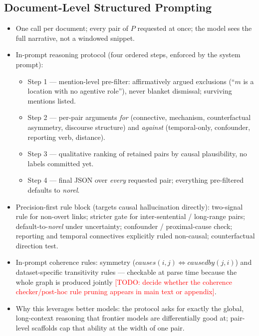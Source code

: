 \documentclass[11pt]{article}
\newcommand{\todo}[1]{\textcolor{red}{[TODO: #1]}}
\newcommand{\method}{SCOTECI}
\begin{document}

\subsection{Document-Level Structured Prompting}
\label{sec:docprompt}
\begin{itemize}
  \item One call per document; every pair of $P$ requested at once; the model
        sees the full narrative, not a windowed snippet.
  \item In-prompt reasoning protocol (four ordered steps, enforced by the
        system prompt):
        \begin{itemize}
          \item Step 1 --- mention-level pre-filter: affirmatively argued
                exclusions (``$m$ is a location with no agentive role''), never
                blanket dismissal; surviving mentions listed.
          \item Step 2 --- per-pair arguments \emph{for} (connective, mechanism,
                counterfactual asymmetry, discourse structure) and
                \emph{against} (temporal-only, confounder, reporting verb,
                distance).
          \item Step 3 --- qualitative ranking of retained pairs by causal
                plausibility, no labels committed yet.
          \item Step 4 --- final JSON over \emph{every} requested pair;
                everything pre-filtered defaults to \textit{norel}.
        \end{itemize}
  \item Precision-first rule block (targets causal hallucination directly):
        two-signal rule for non-overt links; stricter gate for inter-sentential
        / long-range pairs; default-to-\textit{norel} under uncertainty;
        confounder / proximal-cause check; reporting and temporal connectives
        explicitly ruled non-causal; counterfactual direction test.
  \item In-prompt coherence rules: symmetry
        ($\textit{causes}(i,j) \Leftrightarrow \textit{causedby}(j,i)$) and
        dataset-specific transitivity rules --- checkable at parse time because
        the whole graph is produced jointly \todo{decide whether the coherence
        checker/post-hoc rule pruning appears in main text or appendix}.
  \item Why this leverages better models: the protocol asks for exactly the
        global, long-context reasoning that frontier models are differentially
        good at; pair-level scaffolds cap that ability at the width of one pair.
\end{itemize}
\end{document}
